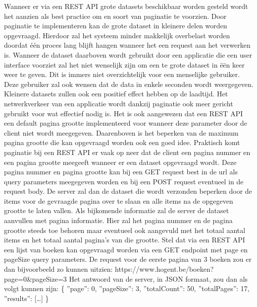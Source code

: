Wanneer er via een REST API grote datasets beschikbaar worden gesteld wordt het aanzien als best practice om en soort van paginatie te voorzien. Door paginatie te
implementeren kan de grote dataset in kleinere delen worden opgevraagd. Hierdoor zal het systeem minder makkelijk overbelast worden doordat \'e\'en proces lang blijft
hangen wanneer het een request aan het verwerken is. Wanneer de dataset daarboven wordt gebruikt door een applicatie die een user interface voorziet zal het
niet wenselijk zijn om een te grote dataset in \"e\"en keer weer te geven. Dit is immers niet overzichtelijk voor een menselijke gebruiker.
Deze gebruiker zal ook wensen dat de data in enkele seconden wordt weergegeven. Kleinere datasets zullen ook een positief effect hebben op de laadtijd.
Het netwerkverkeer van een applicatie wordt dankzij paginatie ook meer gericht gebruikt voor wat effectief nodig is. Het is ook aangewezen dat een REST API een
default pagina grootte implementeerd voor wanneer deze parameter door de client niet wordt meegegeven. Daarenboven is het beperken van de maximum pagina grootte die
kan opgevraagd worden ook een goed idee.
Praktisch komt paginatie bij een REST API er vaak op neer dat de client een pagina nummer en een pagina grootte meegeeft wanneer er een dataset opgevraagd wordt.
Deze pagina nummer en pagina grootte kan bij een GET request best in de url als query parameters meegegeven worden en bij een POST request eventueel in de request body.
De server zal dan de dataset die wordt verzonden beperken door de items voor de gevraagde pagina over te slaan en alle items na de opgegeven grootte te laten vallen.
Als bijkomende informatie zal de server de dataset aanvullen met pagina informatie. Hier zal het pagina nummer en de pagina grootte steeds toe behoren maar eventueel
ook aangevuld met het totaal aantal items en het totaal aantal pagina's van die grootte.
Stel dat via een REST API een lijst van boeken kan opgevraagd worden via een GET endpoint met page en pageSize query parameters. De request voor de eerste pagina
van 3 boeken zou er dan bijvoorbeeld zo kunnen uitzien:\newline
https://www.hogent.be/boeken?page=0\&pageSize=3
Het antwoord van de server, in JSON formaat, zou dan als volgt kunnen zijn:\newline
    \{
        ''page'': 0,
        ''pageSize'': 3,
        ''totalCount'': 50,
        ''totalPages'': 17,
        ''results'': [\ldots]
    \}\newline
~\autocite{paging}\\
~\autocite{wachtenLaadtijd}\\

